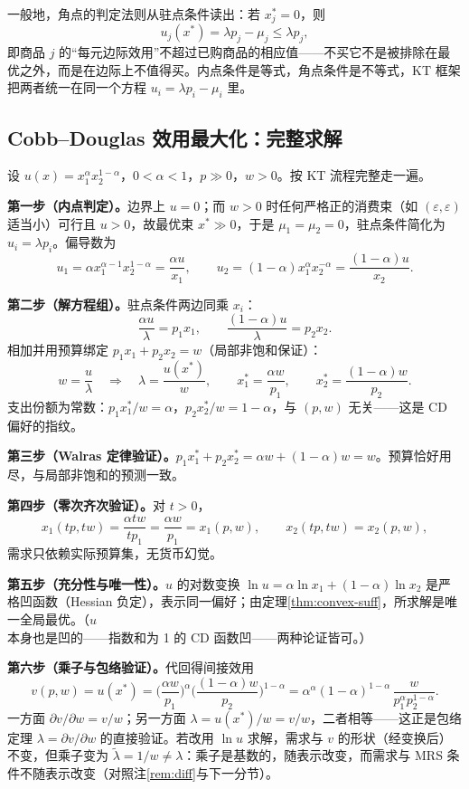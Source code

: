 一般地，角点的判定法则从驻点条件读出：若 $x_j^*=0$，则
\[
 u_j(x^*)=\lambda p_j-\mu_j\le\lambda p_j,
\]
即商品 $j$ 的“每元边际效用”不超过已购商品的相应值——不买它不是被排除在最优之外，而是在边际上不值得买。内点条件是等式，角点条件是不等式，KT 框架把两者统一在同一个方程 $u_i=\lambda p_i-\mu_i$ 里。

\subsection{Cobb--Douglas 效用最大化：完整求解}
\label{sec:cd-solve}

\begin{example}
\label{ex:cd-full}
设 $u(x)=x_1^{\alpha}x_2^{1-\alpha}$，$0<\alpha<1$，$p\gg0$，$w>0$。按 KT 流程完整走一遍。

\textbf{第一步（内点判定）。}边界上 $u=0$；而 $w>0$ 时任何严格正的消费束（如 $(\varepsilon,\varepsilon)$ 适当小）可行且 $u>0$，故最优束 $x^*\gg0$，于是 $\mu_1=\mu_2=0$，驻点条件简化为 $u_i=\lambda p_i$。偏导数为
\[
 u_1=\alpha x_1^{\alpha-1}x_2^{1-\alpha}=\frac{\alpha u}{x_1},
 \qquad
 u_2=(1-\alpha)x_1^{\alpha}x_2^{-\alpha}=\frac{(1-\alpha)u}{x_2}.
\]

\textbf{第二步（解方程组）。}驻点条件两边同乘 $x_i$：
\[
 \frac{\alpha u}{\lambda}=p_1x_1,
 \qquad
 \frac{(1-\alpha)u}{\lambda}=p_2x_2.
\]
相加并用预算绑定 $p_1x_1+p_2x_2=w$（局部非饱和保证）：
\[
 w=\frac{u}{\lambda}
 \quad\Longrightarrow\quad
 \lambda=\frac{u(x^*)}{w},
 \qquad
 x_1^*=\frac{\alpha w}{p_1},
 \qquad
 x_2^*=\frac{(1-\alpha)w}{p_2}.
\]
支出份额为常数：$p_1x_1^*/w=\alpha$，$p_2x_2^*/w=1-\alpha$，与 $(p,w)$ 无关——这是 CD 偏好的指纹。

\textbf{第三步（Walras 定律验证）。}$p_1x_1^*+p_2x_2^*=\alpha w+(1-\alpha)w=w$。预算恰好用尽，与局部非饱和的预测一致。

\textbf{第四步（零次齐次验证）。}对 $t>0$，
\[
 x_1(tp,tw)=\frac{\alpha tw}{tp_1}=\frac{\alpha w}{p_1}=x_1(p,w),
 \qquad x_2(tp,tw)=x_2(p,w),
\]
需求只依赖实际预算集，无货币幻觉。

\textbf{第五步（充分性与唯一性）。}$u$ 的对数变换 $\ln u=\alpha\ln x_1+(1-\alpha)\ln x_2$ 是严格凹函数（Hessian 负定），表示同一偏好；由定理\ref{thm:convex-suff}，所求解是唯一全局最优。（$u$ 本身也是凹的——指数和为 1 的 CD 函数凹——两种论证皆可。）

\textbf{第六步（乘子与包络验证）。}代回得间接效用
\[
 v(p,w)=u(x^*)=\Big(\frac{\alpha w}{p_1}\Big)^{\alpha}
 \Big(\frac{(1-\alpha)w}{p_2}\Big)^{1-\alpha}
 =\alpha^{\alpha}(1-\alpha)^{1-\alpha}\,
 \frac{w}{p_1^{\alpha}p_2^{1-\alpha}} .
\]
一方面 $\partial v/\partial w=v/w$；另一方面 $\lambda=u(x^*)/w=v/w$，二者相等——这正是包络定理 $\lambda=\partial v/\partial w$ 的直接验证。若改用 $\ln u$ 求解，需求与 $v$ 的形状（经变换后）不变，但乘子变为 $\tilde\lambda=1/w\ne\lambda$：乘子是基数的，随表示改变，而需求与 MRS 条件不随表示改变（对照注\ref{rem:diff}与下一分节）。
\end{example}
